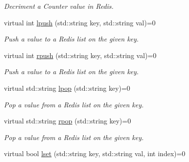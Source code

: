 \begin{DoxyCompactItemize}
\begin{DoxyCompactList}\small\item\em Decriment a Counter value in Redis. \end{DoxyCompactList}\item 
\hypertarget{classRedisInterface_a300bdd29f8a198b57f4760c24d832e46}{virtual int \hyperlink{classRedisInterface_a300bdd29f8a198b57f4760c24d832e46}{lpush} (std\-::string key, std\-::string val)=0}\label{classRedisInterface_a300bdd29f8a198b57f4760c24d832e46}

\begin{DoxyCompactList}\small\item\em Push a value to a Redis list on the given key. \end{DoxyCompactList}\item 
\hypertarget{classRedisInterface_a7a1e75499b8beda20d514f4baa0c488b}{virtual int \hyperlink{classRedisInterface_a7a1e75499b8beda20d514f4baa0c488b}{rpush} (std\-::string key, std\-::string val)=0}\label{classRedisInterface_a7a1e75499b8beda20d514f4baa0c488b}

\begin{DoxyCompactList}\small\item\em Push a value to a Redis list on the given key. \end{DoxyCompactList}\item 
\hypertarget{classRedisInterface_a461d229377c71435c0f83f42a2e3acae}{virtual std\-::string \hyperlink{classRedisInterface_a461d229377c71435c0f83f42a2e3acae}{lpop} (std\-::string key)=0}\label{classRedisInterface_a461d229377c71435c0f83f42a2e3acae}

\begin{DoxyCompactList}\small\item\em Pop a value from a Redis list on the given key. \end{DoxyCompactList}\item 
\hypertarget{classRedisInterface_ad10c64204a6ea7e11605848c968939b2}{virtual std\-::string \hyperlink{classRedisInterface_ad10c64204a6ea7e11605848c968939b2}{rpop} (std\-::string key)=0}\label{classRedisInterface_ad10c64204a6ea7e11605848c968939b2}

\begin{DoxyCompactList}\small\item\em Pop a value from a Redis list on the given key. \end{DoxyCompactList}\item 
\hypertarget{classRedisInterface_af4fd798b32c37f6ca6561284d66a8265}{virtual bool \hyperlink{classRedisInterface_af4fd798b32c37f6ca6561284d66a8265}{lset} (std\-::string key, std\-::string val, int index)=0}\label{classRedisInterface_af4fd798b32c37f6ca6561284d66a8265}


\end{DoxyCompactItemize}
